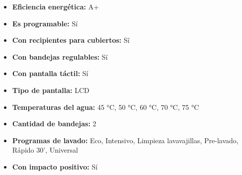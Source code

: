 \documentclass{article}
\begin{document}
\begin{adjustwidth}{2em}{}
\begin{itemize}
\begin{itemize}
    \item \textbf {Eficiencia energética:} A+
    \item \textbf {Es programable:} Sí
    \item \textbf {Con recipientes para cubiertos:} Sí
    \item \textbf {Con bandejas regulables:} Sí
    \item \textbf {Con pantalla táctil:} Sí
    \item \textbf {Tipo de pantalla:} LCD
    \item \textbf {Temperaturas del agua:} 45 °C, 50 °C, 60 °C, 70 °C, 75 °C
    \item \textbf {Cantidad de bandejas:} 2
    \item \textbf {Programas de lavado:} Eco, Intensivo, Limpieza lavavajillas, Pre-lavado, Rápido 30', Universal
    \item \textbf {Con impacto positivo:} Sí
        \end{itemize}
    \end{itemize}

    \vspace{1\baselineskip} %
    \end{adjustwidth}
\end{document}

